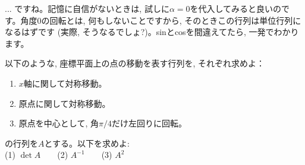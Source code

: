 \begin{faq}{\small{}
... ですね。記憶に自信がないときは, 
試しに$\alpha=0$を代入してみると良いのです。角度0の回転とは,
 何もしないことですから, そのときこの行列は単位行列になるはずです
(実際, そうなるでしょ?)。sinとcosを間違えてたら, 一発でわかります。}\end{faq}

\begin{q}\label{q:matrix_lintrans2D4} 以下のような, 座標平面上の点の移動を表す行列を, それぞれ求めよ：
\begin{enumerate}
\item $x$軸に関して対称移動。
\item 原点に関して対称移動。
\item 原点を中心として, 角$\pi/4$だけ左回りに回転。
\end{enumerate}\end{q}
\mv

\begin{q}\label{q:matrix_lintrans2D6} の行列を$A$とする。以下を求めよ:\\
(1) $\det A$　　(2) $A^{-1}$　　(3) $A^2$\end{q}
\mv


